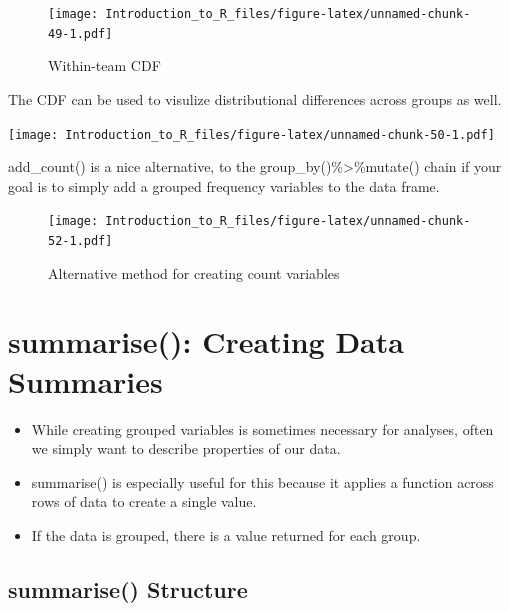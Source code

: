 \documentclass[]{book}
\newenvironment{Shaded}{\begin{snugshade}}{\end{snugshade}}
\newcommand{\KeywordTok}[1]{\textcolor[rgb]{0.13,0.29,0.53}{\textbf{#1}}}
\newcommand{\NormalTok}[1]{#1}
\newcommand{\OperatorTok}[1]{\textcolor[rgb]{0.81,0.36,0.00}{\textbf{#1}}}
\newcommand{\StringTok}[1]{\textcolor[rgb]{0.31,0.60,0.02}{#1}}
\providecommand{\tightlist}{%
  \setlength{\itemsep}{0pt}\setlength{\parskip}{0pt}}
\theoremstyle{definition}
\theoremstyle{definition}
\theoremstyle{definition}
\theoremstyle{remark}
\let\BeginKnitrBlock\begin \let\EndKnitrBlock\end
\begin{document}
\begin{figure}
\centering
\texttt{[image: Introduction\_to\_R\_files/figure-latex/unnamed-chunk-49-1.pdf]}
\caption{\label{fig:unnamed-chunk-49}Within-team CDF}
\end{figure}

The CDF can be used to visulize distributional differences across groups as well.

\texttt{[image: Introduction\_to\_R\_files/figure-latex/unnamed-chunk-50-1.pdf]}

\BeginKnitrBlock{example}
\protect\hypertarget{exm:addcount}{}{\label{exm:addcount} }add\_count() is a nice alternative, to the group\_by()\%\textgreater{}\%mutate() chain if your goal is to simply add a grouped frequency variables to the data frame.
\EndKnitrBlock{example}

\begin{Shaded}
\end{Shaded}

\begin{figure}
\centering
\texttt{[image: Introduction\_to\_R\_files/figure-latex/unnamed-chunk-52-1.pdf]}
\caption{\label{fig:unnamed-chunk-52}Alternative method for creating count variables}
\end{figure}

\hypertarget{sum}{%
\section{summarise(): Creating Data Summaries}\label{sum}}

\begin{itemize}
\tightlist
\item
  While creating grouped variables is sometimes necessary for analyses, often we simply want to describe properties of our data.
\item
  summarise() is especially useful for this because it applies a function across rows of data to create a single value.
\item
  If the data is grouped, there is a value returned for each group.
\end{itemize}

\hypertarget{summarise-structure}{%
\subsection{summarise() Structure}\label{summarise-structure}}
\end{document}
